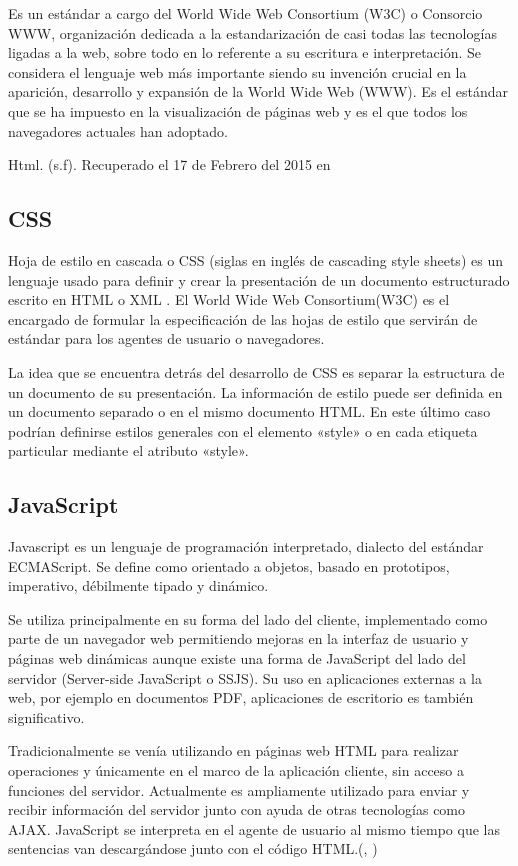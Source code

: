 Es un estándar a cargo del World Wide Web Consortium (W3C) o Consorcio WWW, organización dedicada a la estandarización de casi todas las tecnologías ligadas a la web, sobre todo en lo referente a su escritura e interpretación. Se considera el lenguaje web más importante siendo su invención crucial en la aparición, desarrollo y expansión de la World Wide Web (WWW). Es el estándar que se ha impuesto en la visualización de páginas web y es el que todos los navegadores actuales han adoptado.
\setlength{\parskip}{0mm}

Html. (s.f). Recuperado el 17 de Febrero del 2015 en

\subsection{CSS}
\setlength{\parskip}{5mm}
Hoja de estilo en cascada o CSS (siglas en inglés de cascading style sheets) es un lenguaje usado para definir y crear la presentación de un documento estructurado escrito en HTML o XML . El World Wide Web Consortium(W3C) es el encargado de formular la especificación de las hojas de estilo que servirán de estándar para los agentes de usuario o navegadores.

La idea que se encuentra detrás del desarrollo de CSS es separar la estructura de un documento de su presentación.
La información de estilo puede ser definida en un documento separado o en el mismo documento HTML. En este último caso podrían definirse estilos generales con el elemento «style» o en cada etiqueta particular mediante el atributo «style».
\setlength{\parskip}{0mm}

\subsection{JavaScript}
\setlength{\parskip}{5mm}
Javascript es un lenguaje de programación interpretado, dialecto del estándar ECMAScript. Se define como orientado a objetos, basado en prototipos, imperativo, débilmente tipado y dinámico.

Se utiliza principalmente en su forma del lado del cliente, implementado como parte de un navegador web permitiendo mejoras en la interfaz de usuario y páginas web dinámicas aunque existe una forma de JavaScript del lado del servidor (Server-side JavaScript o SSJS). Su uso en aplicaciones externas a la web, por ejemplo en documentos PDF, aplicaciones de escritorio es también significativo.

Tradicionalmente se venía utilizando en páginas web HTML para realizar operaciones y únicamente en el marco de la aplicación cliente, sin acceso a funciones del servidor. Actualmente es ampliamente utilizado para enviar y recibir información del servidor junto con ayuda de otras tecnologías como AJAX. JavaScript se interpreta en el agente de usuario al mismo tiempo que las sentencias van descargándose junto con el código HTML.(\citeauthor{javascripbib}, \citeyear{javascripbib})
\setlength{\parskip}{0mm}


